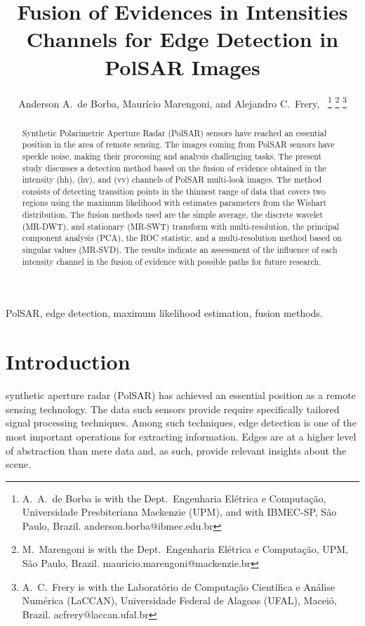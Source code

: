\documentclass[journal]{IEEEtran}
\begin{document}
\title{Fusion of Evidences in Intensities Channels for Edge Detection in PolSAR Images}
\author{Anderson A.\ de Borba, Maurício Marengoni, and Alejandro C.\ Frery,~%
\thanks{A.\ A.\ de Borba is with the Dept.\ Engenharia Elétrica e Computação, Universidade Presbiteriana Mackenzie (UPM), and with IBMEC-SP, São Paulo, Brazil. anderson.borba@ibmec.edu.br}
\thanks{M.\ Marengoni is with the Dept.\ Engenharia Elétrica e Computação,
UPM, São Paulo, Brazil. mauricio.marengoni@mackenzie.br}
\thanks{A.\ C.\ Frery is with the Laboratório de Computação Científica e Análise Numérica (LaCCAN), Universidade Federal de Alagoas (UFAL), Maceió, Brazil. acfrery@laccan.ufal.br}}

\maketitle

\begin{abstract}
Synthetic Polarimetric Aperture Radar (PolSAR) sensors have reached an essential position in the area of remote sensing. 
The images coming from PolSAR sensors have speckle noise, making their processing and analysis challenging tasks. 
The present study discusses a detection method based on the fusion of evidence obtained in the intensity (hh), (hv), and (vv) channels of PolSAR multi-look images. 
The method consists of detecting transition points in the thinnest range of data that covers two regions using the maximum likelihood with estimates parameters from the Wishart distribution. 
The fusion methods used are the simple average, the discrete wavelet (MR-DWT), and stationary (MR-SWT) transform with multi-resolution, the principal component analysis (PCA), the ROC statistic, and a multi-resolution method based on singular values (MR-SVD). 
The results indicate an assessment of the influence of each intensity channel in the fusion of evidence with possible paths for future research.
\end{abstract}

\begin{IEEEkeywords}
PolSAR, edge detection, maximum likelihood estimation, fusion methods. 
\end{IEEEkeywords}

\section{Introduction}\label{sec_01}
 synthetic aperture radar (PolSAR) has achieved an essential position as a remote sensing technology. 
The data such sensors provide require specifically tailored signal processing techniques.
Among such techniques, edge detection is one of the most important operations for extracting information.
Edges are at a higher level of abstraction than mere data and, as such, provide relevant insights about the scene.
\end{document}
